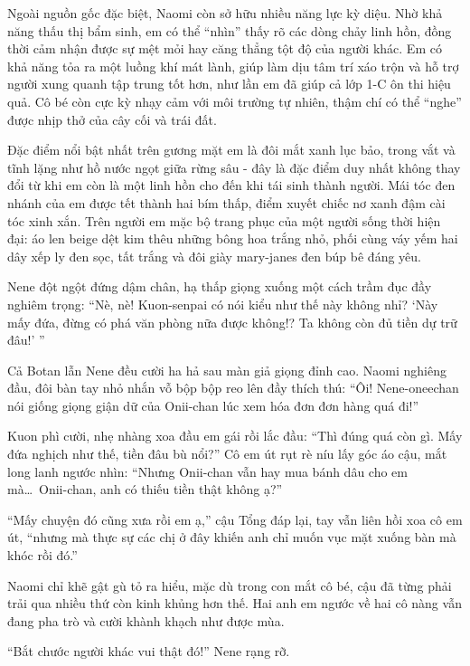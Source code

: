 \documentclass[../main.tex]{subfiles}
\begin{document}

Ngoài nguồn gốc đặc biệt, Naomi còn sở hữu nhiều năng lực kỳ diệu. Nhờ khả năng thấu thị bẩm sinh, em có thể ``nhìn'' thấy rõ các dòng chảy linh hồn, đồng thời cảm nhận được sự mệt mỏi hay căng thẳng tột độ của người khác. Em có khả năng tỏa ra một luồng khí mát lành, giúp làm dịu tâm trí xáo trộn và hỗ trợ người xung quanh tập trung tốt hơn, như lần em đã giúp cả lớp 1-C ôn thi hiệu quả. Cô bé còn cực kỳ nhạy cảm với môi trường tự nhiên, thậm chí có thể ``nghe'' được nhịp thở của cây cối và trái đất.

Đặc điểm nổi bật nhất trên gương mặt em là đôi mắt xanh lục bảo, trong vắt và tĩnh lặng như hồ nước ngọt giữa rừng sâu - đây là đặc điểm duy nhất không thay đổi từ khi em còn là một linh hồn cho đến khi tái sinh thành người. Mái tóc đen nhánh của em được tết thành hai bím thấp, điểm xuyết chiếc nơ xanh đậm cài tóc xinh xắn. Trên người em mặc bộ trang phục của một người sống thời hiện đại: áo len beige dệt kim thêu những bông hoa trắng nhỏ, phối cùng váy yếm hai dây xếp ly đen sọc, tất trắng và đôi giày mary-janes đen búp bê đáng yêu.

\chrint

Nene đột ngột đứng dậm chân, hạ thấp giọng xuống một cách trầm đục đầy nghiêm trọng: ``Nè, nè! Kuon-senpai có nói kiểu như thế này không nhỉ? `Này mấy đứa, đừng có phá văn phòng nữa được không!? Ta không còn đủ tiền dự trữ đâu!' ''

Cả Botan lẫn Nene đều cười ha hả sau màn giả giọng đỉnh cao. Naomi nghiêng đầu, đôi bàn tay nhỏ nhắn vỗ bộp bộp reo lên đầy thích thú: ``Ôi! Nene-oneechan nói giống giọng giận dữ của Onii-chan lúc xem hóa đơn đơn hàng quá đi!''

Kuon phì cười, nhẹ nhàng xoa đầu em gái rồi lắc đầu: ``Thì đúng quá còn gì. Mấy đứa nghịch như thế, tiền đâu bù nổi?'' Cô em út rụt rè níu lấy góc áo cậu, mắt long lanh ngước nhìn: ``Nhưng Onii-chan vẫn hay mua bánh dâu cho em mà\dots\ Onii-chan, anh có thiếu tiền thật không ạ?''

``Mấy chuyện đó cũng xưa rồi em ạ,'' cậu Tổng đáp lại, tay vẫn liên hồi xoa cô em út, ``nhưng mà thực sự các chị ở đây khiến anh chỉ muốn vục mặt xuống bàn mà khóc rồi đó.''

Naomi chỉ khẽ gật gù tỏ ra hiểu, mặc dù trong con mắt cô bé, cậu đã từng phải trải qua nhiều thứ còn kinh khủng hơn thế. Hai anh em ngước về hai cô nàng vẫn đang pha trò và cười khành khạch như được mùa.

``Bắt chước người khác vui thật đó!'' Nene rạng rỡ.
\end{document}
